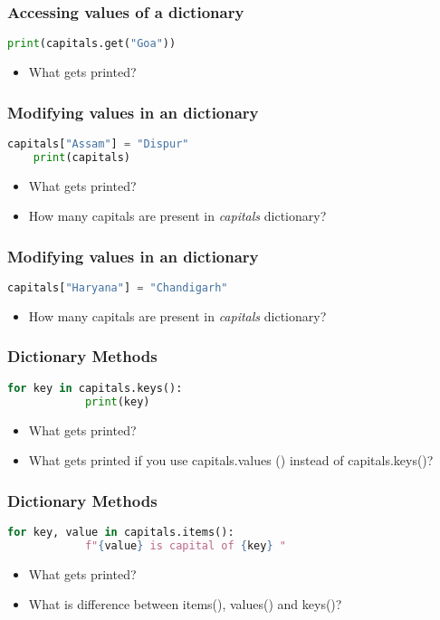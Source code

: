 \documentclass[14pt]{beamer}
\begin{document}
     \begin{frame}[containsverbatim]
	\frametitle{Accessing values of a dictionary}
	\begin{lstlisting}[language=python]
	print(capitals.get("Goa"))
	\end{lstlisting}
	\begin{itemize} \item What gets printed? \end{itemize}
    \end{frame} 
    \begin{frame}[containsverbatim]
	\frametitle{Modifying values in an dictionary}
	\begin{lstlisting}[language=Python]
	capitals["Assam"] = "Dispur"
	print(capitals)
	\end{lstlisting}
	\begin{itemize}
		\item What gets printed?
		\item How many capitals are present in \emph{capitals} dictionary?
	\end{itemize}
    \end{frame}
    \begin{frame}[containsverbatim]
	\frametitle{Modifying values in an dictionary}
        \begin{lstlisting}[language=Python]
	capitals["Haryana"] = "Chandigarh"
	\end{lstlisting}
	\begin{itemize}
		\item  How many capitals are present in \emph{capitals} dictionary?
	\end{itemize}
    \end{frame}
    \begin{frame}[containsverbatim]
	\frametitle{Dictionary Methods}
	\begin{lstlisting}[language=python]
	for key in capitals.keys():
            print(key)
	\end{lstlisting}
	\begin{itemize}
		\item What gets printed?
		\item What gets printed if you use capitals.values () instead of capitals.keys()? 
	\end{itemize}
    \end{frame}
    \begin{frame}[containsverbatim]
	\frametitle{Dictionary Methods}
	\begin{lstlisting}[language=python]
	for key, value in capitals.items():
            f"{value} is capital of {key} "
	\end{lstlisting}
	\begin{itemize}
		\item What gets printed?
		\item What is difference between items(), values() and keys()?
	\end{itemize}
    \end{frame}
\end{document}
